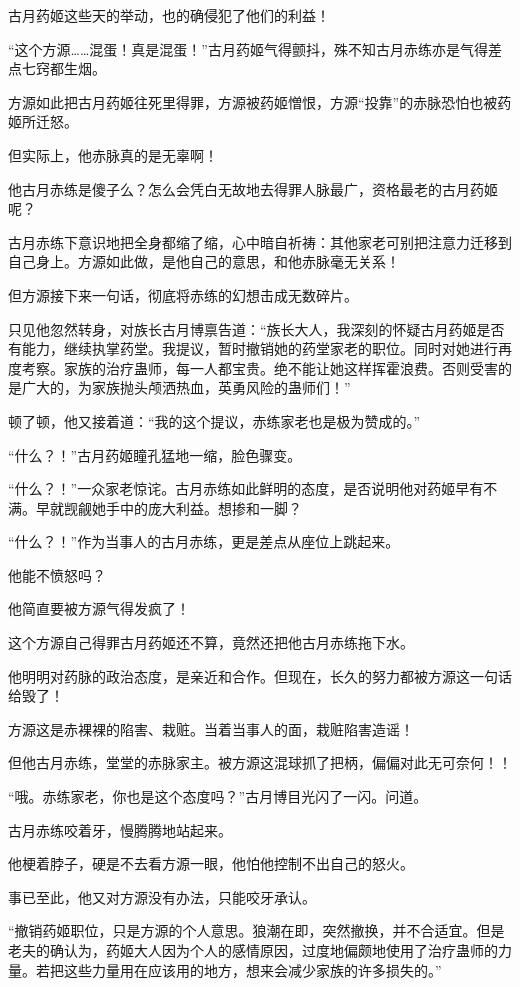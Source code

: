 \begin{this_body}
古月药姬这些天的举动，也的确侵犯了他们的利益！

“这个方源……混蛋！真是混蛋！”古月药姬气得颤抖，殊不知古月赤练亦是气得差点七窍都生烟。

方源如此把古月药姬往死里得罪，方源被药姬憎恨，方源“投靠”的赤脉恐怕也被药姬所迁怒。

但实际上，他赤脉真的是无辜啊！

他古月赤练是傻子么？怎么会凭白无故地去得罪人脉最广，资格最老的古月药姬呢？

古月赤练下意识地把全身都缩了缩，心中暗自祈祷：其他家老可别把注意力迁移到自己身上。方源如此做，是他自己的意思，和他赤脉毫无关系！

但方源接下来一句话，彻底将赤练的幻想击成无数碎片。

只见他忽然转身，对族长古月博禀告道：“族长大人，我深刻的怀疑古月药姬是否有能力，继续执掌药堂。我提议，暂时撤销她的药堂家老的职位。同时对她进行再度考察。家族的治疗蛊师，每一人都宝贵。绝不能让她这样挥霍浪费。否则受害的是广大的，为家族抛头颅洒热血，英勇风险的蛊师们！”

顿了顿，他又接着道：“我的这个提议，赤练家老也是极为赞成的。”

“什么？！”古月药姬瞳孔猛地一缩，脸色骤变。

“什么？！”一众家老惊诧。古月赤练如此鲜明的态度，是否说明他对药姬早有不满。早就觊觎她手中的庞大利益。想掺和一脚？

“什么？！”作为当事人的古月赤练，更是差点从座位上跳起来。

他能不愤怒吗？

他简直要被方源气得发疯了！

这个方源自己得罪古月药姬还不算，竟然还把他古月赤练拖下水。

他明明对药脉的政治态度，是亲近和合作。但现在，长久的努力都被方源这一句话给毁了！

方源这是赤裸裸的陷害、栽赃。当着当事人的面，栽赃陷害造谣！

但他古月赤练，堂堂的赤脉家主。被方源这混球抓了把柄，偏偏对此无可奈何！！

“哦。赤练家老，你也是这个态度吗？”古月博目光闪了一闪。问道。

古月赤练咬着牙，慢腾腾地站起来。

他梗着脖子，硬是不去看方源一眼，他怕他控制不出自己的怒火。

事已至此，他又对方源没有办法，只能咬牙承认。

“撤销药姬职位，只是方源的个人意思。狼潮在即，突然撤换，并不合适宜。但是老夫的确认为，药姬大人因为个人的感情原因，过度地偏颇地使用了治疗蛊师的力量。若把这些力量用在应该用的地方，想来会减少家族的许多损失的。”


\end{this_body}
